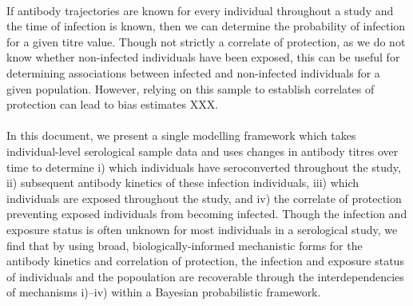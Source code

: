 \paragraph{}If antibody trajectories are known for every individual throughout a study and the time of infection is known, then we can determine the probability of infection for a given titre value. Though not strictly a correlate of protection, as we do not know whether non-infected individuals have been exposed, this can be useful for determining associations between infected and non-infected individuals for a given population. However, relying on this sample to establish correlates of protection can lead to bias estimates XXX. 

\paragraph{}In this document, we present a single modelling framework which takes individual-level serological sample data and uses changes in antibody titres over time to determine i) which individuals have seroconverted throughout the study, ii) subsequent antibody kinetics of these infection individuals, iii) which individuals are exposed throughout the study, and iv) the correlate of protection preventing exposed individuals from becoming infected. Though the infection and exposure status is often unknown for most individuals in a serological study, we find that by using broad, biologically-informed mechanistic forms for the antibody kinetics and correlation of protection, the infection and exposure status of individuals and the popoulation are recoverable through the interdependencies of mechanisms i)–iv) within a Bayesian probabilistic framework. 